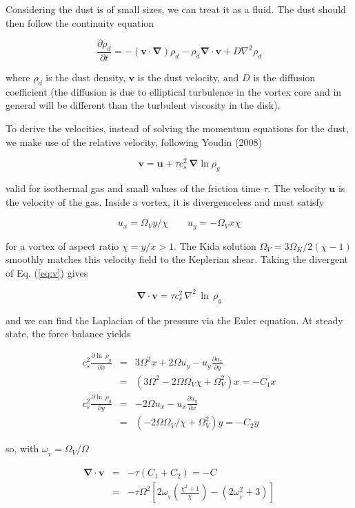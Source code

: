 \documentclass[apj]{emulateapj}
\newcommand{\pderiv}[2]{\frac{\partial #1}{\partial #2}}
\renewcommand{\v}[1]{{\boldsymbol{#1}}} %
\newcommand{\del}{\v{\nabla}}
\newcommand{\grad}{\del}
\newcommand{\Div}{\del\cdot}
\newcommand{\Laplace}{\nabla^2}
\newcommand{\Eq}[1]{Eq. (\ref{#1})}
\newcommand{\eq}[1]{\Eq{#1}}
\newcommand{\beq}{\begin{equation}}
\newcommand{\eeq}{\end{equation}}
\newcommand{\beqn}{\begin{eqnarray}}
\newcommand{\eeqn}{\end{eqnarray}}
\begin{document}
Considering the dust is of small sizes, we can treat it as a
fluid. The dust should then follow the continuity equation 

\beq
  \pderiv{\rho_d}{t} = -(\v{v}\cdot\del)\rho_d - \rho_d \Div{\v{v}} + D\Laplace{\rho_d}
\eeq

\noindent where $\rho_d$ is the dust density, $\v{v}$ is the dust
velocity, and $D$ is the diffusion coefficient (the diffusion is due
to elliptical turbulence in the vortex core and in general will be
different than the turbulent viscosity in the disk). 

To derive the velocities, instead of solving the momentum equations
for the dust, we make use of the relative velocity, following Youdin
(2008)  

\beq
\v{v} = \v{u} + \tau  c_s^2 \,  \grad{\ln \rho_g} 
\label{eq:v}
\eeq

\noindent valid for isothermal gas and small values of the friction time $\tau$. The
velocity $\v{u}$ is the velocity of the gas. Inside a vortex, it is
divergenceless and must satisfy 

\beq
  u_x = \varOmega_V y / \chi \qquad  u_y= -\varOmega_V x \chi
\eeq

\noindent for a vortex of aspect ratio $\chi= y/x > 1$. The Kida
solution $\varOmega_V = 3\Omega_K/2(\chi-1)$ smoothly matches 
this velocity field to the Keplerian shear. Taking the divergent of
\eq{eq:v} gives 

\beq
\Div{\v{v}} = \tau c_s^2 \, \Laplace{\, \ln \, \rho_g} 
\label{eq:divv}
\eeq

\noindent and we can find the Laplacian of the pressure via the Euler
equation. At steady state, the force balance yields 

\begin{eqnarray}
c_s^2 \pderiv{\ln \,\rho_g}{x} &=& 3\varOmega^2 x + 2\varOmega u_y -
u_y\pderiv{u_x}{y} \nonumber \\
&=& \left(3\varOmega^2 - 2\Omega\Omega_V \chi + \varOmega_V^2\right) x  = -C_1 x  \\
c_s^2 \pderiv{\ln \,\rho_g}{y} &=& - 2\varOmega u_x -
u_x\pderiv{u_y}{x} \nonumber \\
&=& \left(-2\Omega\Omega_V/\chi + \Omega_V^2\right) y = -C_2 y
\end{eqnarray}

\noindent  so, with $\omega_{_V}=\varOmega_V/\varOmega$

\beqn
\Div{\v{v}} &=& -\tau (C_1+C_2) = - C\\
&=& - \tau\varOmega^2 \left[2\omega_{_V}\left(\frac{\chi^2+1}{\chi}\right) - (2\omega_{_V}^2 + 3) \right]
\eeqn
\end{document}
